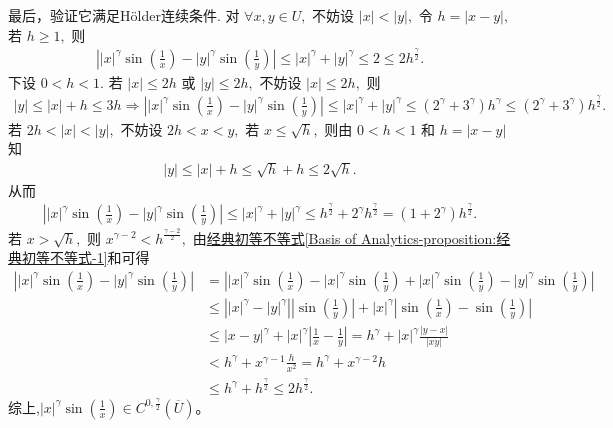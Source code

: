 \documentclass[../../main.tex]{subfiles}
\begin{document}
\begin{examples}
最后，验证它满足H\"older连续条件.
对 $\forall x,y\in U,$ 不妨设 $|x|<|y|,$ 令 $h=|x-y|,$ 若 $h\geqslant 1,$ 则
\begin{align*}
\left| |x|^{\gamma}\sin \left( \frac{1}{x} \right) -|y|^{\gamma}\sin \left( \frac{1}{y} \right) \right|\leqslant |x|^{\gamma}+|y|^{\gamma}\leqslant 2\leqslant 2h^{\frac{\gamma}{2}}.
\end{align*}
下设 $0<h<1.$ 若 $|x|\leqslant 2h$ 或 $|y|\leqslant 2h,$ 不妨设 $|x|\leqslant 2h,$ 则
\begin{align*}
|y|\leqslant |x|+h\leqslant 3h\Longrightarrow \left| |x|^{\gamma}\sin \left( \frac{1}{x} \right) -|y|^{\gamma}\sin \left( \frac{1}{y} \right) \right|\leqslant |x|^{\gamma}+|y|^{\gamma}\leqslant \left( 2^{\gamma}+3^{\gamma} \right) h^{\gamma}\leqslant  \left( 2^{\gamma}+3^{\gamma} \right) h^{\frac{\gamma}{2}}.
\end{align*}
若 $2h<|x|<|y|,$ 不妨设 $2h<x<y,$ 若 $x\leqslant \sqrt{h},$ 则由 $0<h<1$ 和 $h=|x-y|$ 知
\begin{align*}
|y|\leqslant |x|+h\leqslant \sqrt{h}+h\leqslant 2\sqrt{h}.
\end{align*}
从而
\begin{align*}
\left| |x|^{\gamma}\sin \left( \frac{1}{x} \right) -|y|^{\gamma}\sin \left( \frac{1}{y} \right) \right|\leqslant |x|^{\gamma}+|y|^{\gamma}\leqslant h^{\frac{\gamma}{2}}+2^{\gamma}h^{\frac{\gamma}{2}}= \left( 1+2^{\gamma} \right) h^{\frac{\gamma}{2}}.
\end{align*}
若 $x>\sqrt{h},$ 则 $x^{\gamma -2}<h^{\frac{\gamma -2}{2}},$ 由\hyperref[Basis of Analytics-proposition:经典初等不等式]{经典初等不等式\ref{Basis of Analytics-proposition:经典初等不等式-1}}和可得
\begin{align*}
\left| |x|^{\gamma}\sin \left( \frac{1}{x} \right) -|y|^{\gamma}\sin \left( \frac{1}{y} \right) \right| &=\left| |x|^{\gamma}\sin \left( \frac{1}{x} \right) -|x|^{\gamma}\sin \left( \frac{1}{y} \right) +|x|^{\gamma}\sin \left( \frac{1}{y} \right) -|y|^{\gamma}\sin \left( \frac{1}{y} \right) \right| \\
&\leqslant \left| |x|^{\gamma}-|y|^{\gamma} \right|\left| \sin \left( \frac{1}{y} \right) \right|+|x|^{\gamma}\left| \sin \left( \frac{1}{x} \right) -\sin \left( \frac{1}{y} \right) \right| \\
&\leqslant |x-y|^{\gamma}+|x|^{\gamma}\left| \frac{1}{x}-\frac{1}{y} \right|=h^{\gamma}+|x|^{\gamma}\frac{|y-x|}{|xy|} \\
&<h^{\gamma}+x^{\gamma -1}\frac{h}{x^2}=h^{\gamma}+x^{\gamma -2}h \\
&\leqslant h^{\gamma}+h^{\frac{\gamma}{2}}\leqslant 2h^{\frac{\gamma}{2}}.
\end{align*}
综上,$|x|^{\gamma}\sin \left( \frac{1}{x} \right)\in C^{0,\frac{\gamma}{2}}(\overline{U})$。
\end{examples}
\end{document}
